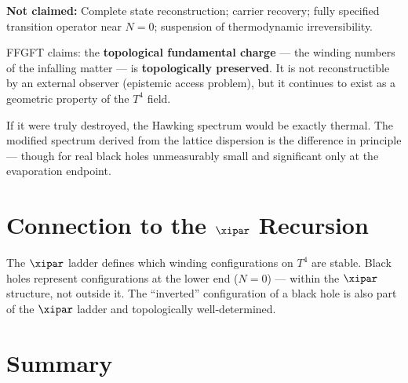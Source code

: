\textbf{Not claimed:} Complete state reconstruction; carrier recovery; fully specified transition operator near $N = 0$; suspension of thermodynamic irreversibility.

\begin{keyresult}
FFGFT claims: the \textbf{topological fundamental charge} --- the winding numbers of the infalling matter --- is \textbf{topologically preserved}. It is not reconstructible by an external observer (epistemic access problem), but it continues to exist as a geometric property of the $T^4$ field.

If it were truly destroyed, the Hawking spectrum would be exactly thermal. The modified spectrum derived from the lattice dispersion is the difference in principle --- though for real black holes unmeasurably small and significant only at the evaporation endpoint.
\end{keyresult}

\section{Connection to the $\xipar$ Recursion}

The $\xipar$ ladder defines which winding configurations on $T^4$ are stable. Black holes represent configurations at the lower end ($N = 0$) --- within the $\xipar$ structure, not outside it. The ``inverted'' configuration of a black hole is also part of the $\xipar$ ladder and topologically well-determined.

\section*{Summary}

